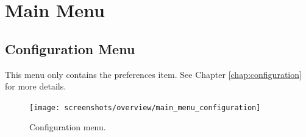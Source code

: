 \section{Main Menu}
\label{sec:main_menu}

\subsection{}
\subsection{Configuration Menu}
This menu only contains the preferences item. See Chapter
\ref{chap:configuration} for more details.
\begin{figure}[H]
  \centering
  \scalebox{0.5}
	   { \texttt{[image: screenshots/overview/main\_menu\_configuration]} }
	   \caption{Configuration menu.}
	   \label{fig:main_menu_configuration}
\end{figure}
